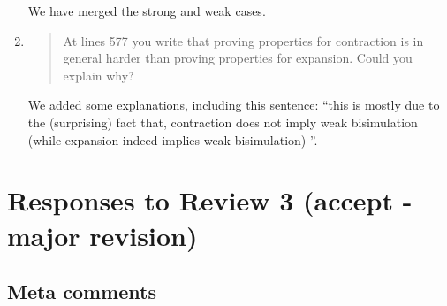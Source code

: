 \begin{enumerate}
  We have merged the strong and weak cases.
  
\item \begin{quote}
    At lines 577 you write that proving properties for contraction is
    in general harder than proving properties for expansion. Could you
    explain why?
  \end{quote}

  We added some explanations, including this sentence:
 ``this is mostly due to the (surprising) fact
 that, contraction does not imply weak bisimulation (while expansion
 indeed implies weak bisimulation) ''.

\end{enumerate}

\section*{Responses to Review 3 (accept - major revision)}

\subsection*{Meta comments}

